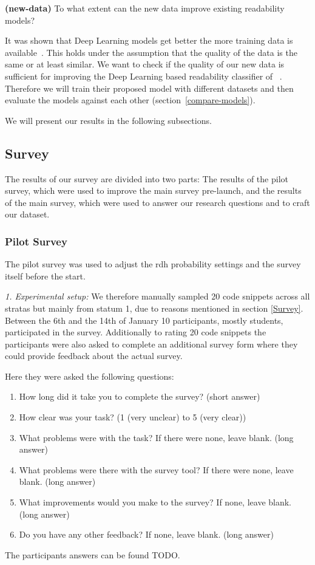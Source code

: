 \documentclass[%
class=scrreprt,
chapterprefix=false,%
open=right,%
twoside=false,%
paper=a4,%
logofile={Logo\_zentral\_farbig\_EN.png},%
thesistype=master,%
UKenglish,%
]{se2thesis}
\theoremstyle{definition}
\begin{document}
	\begin{resq} \textbf{(new-data)} To what extent can the new data improve existing readability models?\end{resq} \label{new-data}
	It was shown that Deep Learning models get better the more training data is available~\cite{hestness2017deep}. This holds under the assumption that the quality of the data is the same or at least similar. We want to check if the quality of our new data is sufficient for improving the Deep Learning based readability classifier of \citeauthor{mi2022towards}~\cite{mi2022towards}. Therefore we will train their proposed model with different datasets and then evaluate the models against each other (section~\ref{compare-models}).

	We will present our results in the following subsections.

\subsection{Survey} \label{Survey Results}
	The results of our survey are divided into two parts: The results of the pilot survey, which were used to improve the main survey pre-launch, and the results of the main survey, which were used to answer our research questions and to craft our dataset.
	
\subsubsection{Pilot Survey} \label{Pilot Survey}
	The pilot survey was used to adjust the rdh probability settings and the survey itself before the start. 
	
	\textit{1. Experimental setup:}
	We therefore manually sampled 20 code snippets across all stratas but mainly from statum 1, due to reasons mentioned in section \ref{Survey}. Between the 6th and the 14th of January 10 participants, mostly students, participated in the survey. Additionally to rating 20 code snippets the participants were also asked to complete an additional survey form where they could provide feedback about the actual survey.
	
	Here they were asked the following questions:
	\begin{enumerate}
		\item How long did it take you to complete the survey? (short answer)
		\item How clear was your task? (1 (very unclear) to 5 (very clear))
		\item What problems were with the task? If there were none, leave blank. (long answer)
		\item What problems were there with the survey tool? If there were none, leave blank.  (long answer)
		\item What improvements would you make to the survey? If none, leave blank.  (long answer)
		\item Do you have any other feedback? If none, leave blank. (long answer)
	\end{enumerate}
	The participants answers can be found TODO.
	
\end{document}
